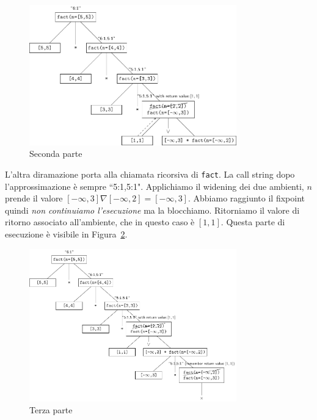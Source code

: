 \begin{figure}[htbp]
    \centering
    \includegraphics[width=0.8\textwidth]{scheme-generator/generated/example-fun-rec-hierarchy-2.pdf}
    \caption{Seconda parte}
    \label{fig:realizzazione:fun-hierarchy-2}
\end{figure}

L'altra diramazione porta alla chiamata ricorsiva di \texttt{fact}. La call string dopo l'approssimazione è sempre \textsf{``5:1,5:1"}. Applichiamo il widening dei due ambienti, $n$ prende il valore $[-\infty,3]\nabla[-\infty,2]=[-\infty,3]$. Abbiamo raggiunto il fixpoint quindi \emph{non continuiamo l'esecuzione} ma la blocchiamo. Ritorniamo il valore di ritorno associato all'ambiente, che in questo caso è $[1,1]$.  Questa parte di esecuzione è visibile in Figura~\ref{fig:realizzazione:fun-hierarchy-3}.

\begin{figure}[htbp]
    \centering
    \includegraphics[width=0.8\textwidth]{scheme-generator/generated/example-fun-rec-hierarchy-3.pdf}
    \caption{Terza parte}
    \label{fig:realizzazione:fun-hierarchy-3}
\end{figure}

